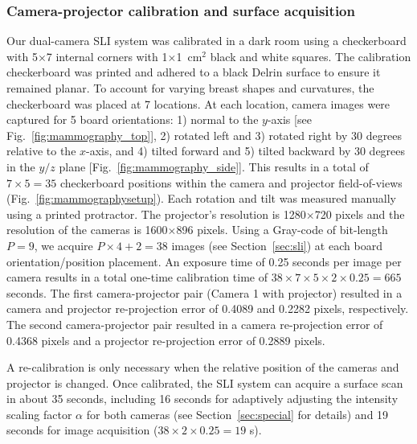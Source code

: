 \subsubsection{Camera-projector calibration and surface acquisition}
\label{ssec:calibrationresults}
Our dual-camera \ac{SLI} system was calibrated in a dark room using a checkerboard with 5$\times$7 internal corners with 1$\times$1~cm$^2$ black and white squares. The calibration checkerboard was printed and adhered to a black Delrin surface to ensure it remained planar. To account for varying breast shapes and curvatures, the checkerboard was placed at 7 locations. At each location, camera images were captured for 5 board orientations: 1) normal to the $y$-axis [see Fig.~\ref{fig:mammography_top}], 2) rotated left and 3) rotated right by 30 degrees relative to the $x$-axis, and 4) tilted forward and 5) tilted backward by 30 degrees in the $y/z$ plane [Fig.~\ref{fig:mammography_side}]. This results in a total of $7\times5=35$ checkerboard positions within the camera and projector field-of-views (Fig.~\ref{fig:mammographysetup}). Each rotation and tilt was measured manually using a printed protractor. The projector's resolution is 1280$\times$720 pixels and the resolution of the cameras is 1600$\times$896 pixels. Using a Gray-code of bit-length $P=9$, we acquire $P\times 4 + 2 = 38$ images (see Section~\ref{sec:sli}) at each board orientation/position placement. An exposure time of 0.25 seconds per image per camera results in a total one-time calibration time of $38 \times 7 \times 5 \times 2 \times 0.25 = 665$ seconds. The first camera-projector pair (Camera 1 with projector) resulted in a camera and projector re-projection error of 0.4089 and 0.2282 pixels, respectively. The second camera-projector pair resulted in a camera re-projection error of 0.4368 pixels and a projector re-projection error of 0.2889 pixels.

A re-calibration is only necessary when the relative position of the cameras and projector is changed. Once calibrated, the \ac{SLI} system can acquire a surface scan in about 35 seconds, including 16 seconds for adaptively adjusting the intensity scaling factor $\alpha$ for both cameras (see Section~\ref{sec:special} for details) and 19 seconds for image acquisition ($38 \times 2\times 0.25 = 19$ s).

